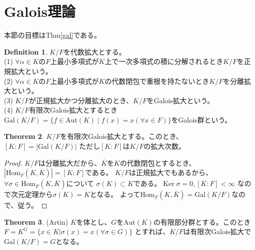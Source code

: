 \documentclass[dvipdfmx]{jsarticle}
\theoremstyle{definition}
\newtheorem{definition}{Definition}[section]
\newtheorem{theorem}[definition]{Theorem}
\DeclareMathOperator{\Ker}{Ker}
\begin{document}
\section{Galois理論}
本節の目標はThm\ref{gal}である。
\begin{definition}
  $K/F$を代数拡大とする。\\
  (1) $\forall\alpha\in K$の$F$上最小多項式が$K$上で一次多項式の積に分解されるとき$K/F$を正規拡大という。\\
  (2) $\forall\alpha\in K$の$F$上最小多項式が$K$の代数閉包で重根を持たないとき$K/F$を分離拡大という。\\
  (3) $K/F$が正規拡大かつ分離拡大のとき、$K/F$をGalois拡大という。\\
  (4) $K/F$有限次Galois拡大とするとき
        $\mathrm{Gal}(K/F)=\{f\in \mathrm{Aut} (K)\mid f(x)=x(\forall x\in F)\}$をGalois群という。
\end{definition}
\begin{theorem}
  $K/F$を有限次Galois拡大とする。このとき、$[K:F]=\left|\mathrm{Gal}(K/F)\right|$
  ただし$[K:F]$は$K/F$の拡大次数。
\end{theorem}
\begin{proof}
  $K/F$は分離拡大だから、$\overline{K}$を$K$の代数閉包とするとき、
  $\left|\mathrm{Hom}_F(K,\overline{K})\right|=[K:F]$である。
  $K/F$は正規拡大でもあるから、$\forall \sigma\in \mathrm{Hom}_F(K,\overline{K})$について
  $\sigma (K)\subset K$である。$\Ker \sigma =0,[K:F]<\infty$
  なので次元定理から$\sigma(K)=K$となる。
  よって$\mathrm{Hom}_F(K,\overline{K})=\mathrm{Gal}(K/F)$なので、従う。
\end{proof}
\begin{theorem}\label{artin}(Artin)
  $K$を体とし、$G$を$\mathrm{Aut}(K)$の有限部分群とする。このとき\\
  $F=K^G=\{x\in K|\sigma (x)=x(\forall\sigma\in G)\}$
  とすれば、$K/F$は有限次Galois拡大で$\mathrm{Gal}(K/F)=G$となる。
\end{theorem}
\end{document}
